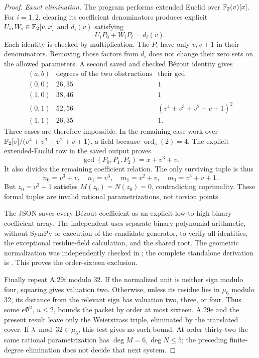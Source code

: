 \begin{proof}
\emph{Exact elimination.}
The program 
performs extended Euclid over $\mathbb F_2(v)[x]$. For $i=1,2$,
clearing its coefficient denominators produces explicit
$U_i,W_i\in\mathbb F_2[v,x]$ and $d_i(v)$ satisfying
\[
 U_iP_0+W_iP_i=d_i(v).
\]
Each identity is checked by multiplication. The $P_i$
have only $v,v+1$ in their denominators. Removing those
factors from $d_i$ does not change their zero sets on
the allowed parameters. A second saved and checked
B\'ezout identity gives
\[
\begin{array}{c|c|c}
(a,b)&\text{degrees of the two obstructions}&\text{their gcd}\\\hline
(0,0)&26,35&1\\
(1,0)&38,46&1\\
(0,1)&52,56&(v^4+v^3+v^2+v+1)^2\\
(1,1)&26,35&1 .
\end{array}
\]
Three cases are therefore impossible. In the remaining
case work over $\mathbb F_2[v]/(v^4+v^3+v^2+v+1)$, a field
because $\operatorname{ord}_5(2)=4$. The explicit
extended-Euclid row in the saved output proves
\[
 \gcd(P_0,P_1,P_2)=x+v^3+v.
\]
It also divides the remaining coefficient relation.
The only surviving tuple is thus
\[
 n_0=v^3+v,\quad n_1=v^3,\quad
 m_1=v^2+v,\quad m_0=v^3+v+1.
\]
But $z_0=v^3+1$ satisfies $M(z_0)=N(z_0)=0$,
contradicting coprimality. These formal tuples are
invalid rational parametrizations, not torsion points.

The JSON saves every B\'ezout coefficient as an explicit
low-to-high binary coefficient array. The independent
uses separate binary polynomial arithmetic, without
SymPy or execution of the candidate generator, to
verify all identities, the exceptional residue-field
calculation, and the shared root. The geometric
normalization was independently checked in
;
the complete standalone derivation is
.
This proves the order-sixteen exclusion.

Finally repeat A.29f modulo $32$. If the normalized
unit is neither sign modulo four, squaring gives
valuation two. Otherwise, unless its residue lies
in $\mu_6$ modulo $32$, its distance from the relevant
sign has valuation two, three, or four. Thus some
$\epsilon\Phi^u$, $u\le2$, bounds the packet by order
at most sixteen. A.29e and the present result leave
only the Weierstrass triple, eliminated by the
translated cover. If $\lambda\bmod32\in\mu_6$,
this test gives no such bound. At order thirty-two
the same rational parametrization has
$\deg M=6,\deg N\le5$; the preceding finite-degree
elimination does not decide that next system.
\end{proof}

